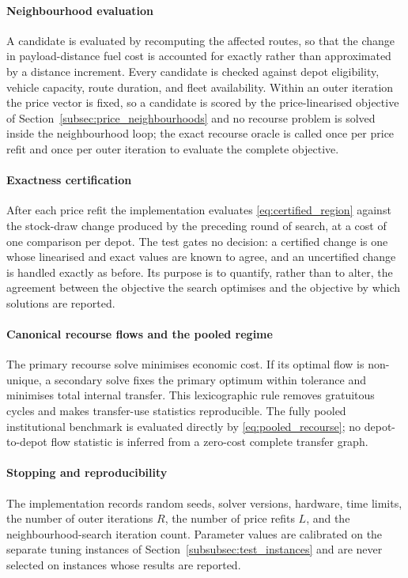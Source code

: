 \documentclass[authoryear,final,3p,times]{elsarticle}
\theoremstyle{definition}
\theoremstyle{plain}
\begin{document}
\paragraph{Neighbourhood evaluation}
A candidate is evaluated by recomputing the affected routes, so that the change in payload-distance fuel cost is accounted for exactly rather than approximated by a distance increment. Every candidate is checked against depot eligibility, vehicle capacity, route duration, and fleet availability. Within an outer iteration the price vector is fixed, so a candidate is scored by the price-linearised objective of Section~\ref{subsec:price_neighbourhoods} and no recourse problem is solved inside the neighbourhood loop; the exact recourse oracle is called once per price refit and once per outer iteration to evaluate the complete objective.

\paragraph{Exactness certification}
After each price refit the implementation evaluates
\eqref{eq:certified_region} against the stock-draw change produced by the
preceding round of search, at a cost of one comparison per depot. The test
gates no decision: a certified change is one whose linearised and exact
values are known to agree, and an uncertified change is handled exactly as
before. Its purpose is to quantify, rather than to alter, the agreement
between the objective the search optimises and the objective by which
solutions are reported.

\paragraph{Canonical recourse flows and the pooled regime}
The primary recourse solve minimises economic cost.  If its optimal flow is non-unique, a secondary solve fixes the primary optimum within tolerance and minimises total internal transfer.  This lexicographic rule removes gratuitous cycles and makes transfer-use statistics reproducible.  The fully pooled institutional benchmark is evaluated directly by \eqref{eq:pooled_recourse}; no depot-to-depot flow statistic is inferred from a zero-cost complete transfer graph.

\paragraph{Stopping and reproducibility}
The implementation records random seeds, solver versions, hardware, time limits, the number of outer iterations $R$, the number of price refits $L$, and the neighbourhood-search iteration count. Parameter values are calibrated on the separate tuning instances of Section~\ref{subsubsec:test_instances} and are never selected on instances whose results are reported.
\end{document}
